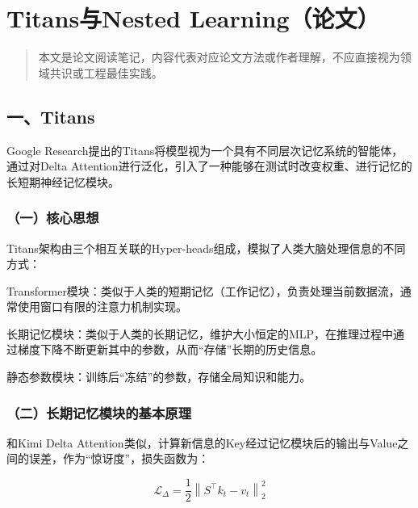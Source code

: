\clearpage

\hypertarget{titansux4e0enested-learningux8bbaux6587}{%
\section{Titans与Nested Learning（论文）}\label{titansux4e0enested-learningux8bbaux6587}}

\begin{quote}
本文是论文阅读笔记，内容代表对应论文方法或作者理解，不应直接视为领域共识或工程最佳实践。
\end{quote}

\hypertarget{ux4e00titans}{%
\subsection{一、Titans}\label{ux4e00titans}}

Google Research提出的Titans将模型视为一个具有不同层次记忆系统的智能体，通过对Delta Attention进行泛化，引入了一种能够在测试时改变权重、进行记忆的长短期神经记忆模块。

\hypertarget{ux4e00ux6838ux5fc3ux601dux60f3-14}{%
\subsubsection{（一）核心思想}\label{ux4e00ux6838ux5fc3ux601dux60f3-14}}

Titans架构由三个相互关联的Hyper-heads组成，模拟了人类大脑处理信息的不同方式：

Transformer模块：类似于人类的短期记忆（工作记忆），负责处理当前数据流，通常使用窗口有限的注意力机制实现。

长期记忆模块：类似于人类的长期记忆，维护大小恒定的MLP，在推理过程中通过梯度下降不断更新其中的参数，从而``存储''长期的历史信息。

静态参数模块：训练后``冻结''的参数，存储全局知识和能力。

\hypertarget{ux4e8cux957fux671fux8bb0ux5fc6ux6a21ux5757ux7684ux57faux672cux539fux7406}{%
\subsubsection{（二）长期记忆模块的基本原理}\label{ux4e8cux957fux671fux8bb0ux5fc6ux6a21ux5757ux7684ux57faux672cux539fux7406}}

和Kimi Delta Attention类似，计算新信息的Key经过记忆模块后的输出与Value之间的误差，作为``惊讶度''，损失函数为：

\[
\mathcal{L}_{\Delta} = \frac{1}{2}\left\|S^\top k_t - v_t\right\|_2^2
\]

